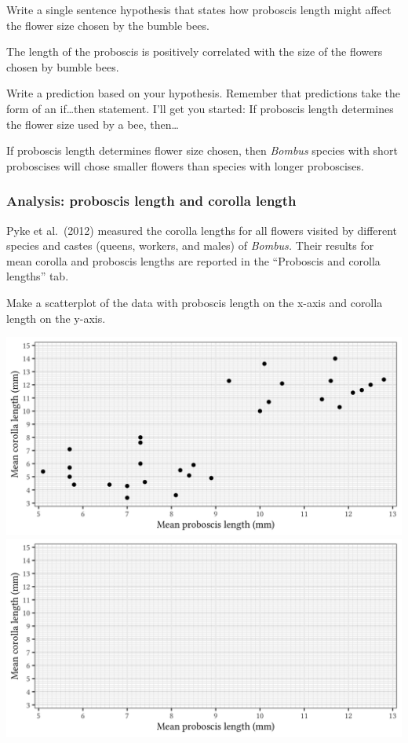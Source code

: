 \documentclass[12pt, hidelinks]{exam}
\newcommand*\AnswerBox[2]{%
    \parbox[t][#1]{0.92\textwidth}{%
    \begin{solution}#2\end{solution}}
    \vspace{\stretch{1}}
}
\begin{document}
\begin{questions}

\bigskip

\question
Write a single sentence hypothesis that states how proboscis length might affect the flower size chosen by the bumble bees.

\AnswerBox{2\baselineskip}{The length of the proboscis is positively correlated with the size	of the flowers chosen by bumble bees.}

\question
Write a prediction based on your hypothesis. Remember that predictions take the form of an if\dots then statement. I'll get you started: If proboscis length determines the flower size used by a bee, then\dots

\AnswerBox{3\baselineskip}{If proboscis length determines flower size chosen, then \textit{Bombus} species with short proboscises will chose smaller flowers than species with longer proboscises.}


\subsubsection*{Analysis: proboscis length and corolla length}\label{sec:proboscis_flower_length}

Pyke et al.~(2012) measured the corolla lengths for all flowers visited by different species and castes (queens, workers, and males) of \textit{Bombus.} Their results for mean corolla and proboscis lengths are reported in the “Proboscis and corolla lengths” tab. 

\question
Make a scatterplot of the data with proboscis length on the x-axis and corolla length on the y-axis.

\ifprintanswers
	\includegraphics[width=\textwidth]{proboscis_corolla_key}
\else
	\includegraphics[width=\textwidth]{proboscis_corolla_blank}
\fi


\end{questions}
\end{document}

